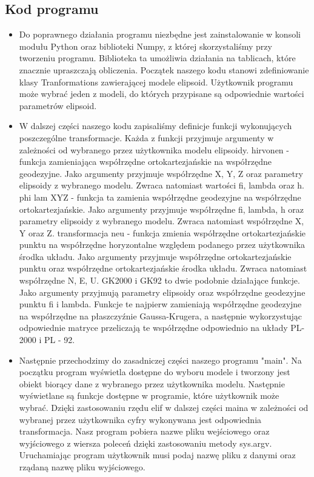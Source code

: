 \documentclass[10pt,a4paper]{article}
\begin{document}
\subsection{Kod programu}
\begin{itemize}
	\item Do poprawnego działania programu niezbędne jest zainstalowanie w konsoli modułu Python oraz biblioteki Numpy, z której skorzystaliśmy przy tworzeniu programu. Biblioteka ta umożliwia działania na tablicach, które znacznie upraszczają obliczenia. Początek naszego kodu stanowi zdefiniowanie klasy Tranformations zawierającej modele elipsoid. Użytkownik programu może wybrać jeden z modeli, do których przypisane są odpowiednie wartości parametrów elipsoid.
	\item W dalszej części naszego kodu zapisaliśmy definicje funkcji wykonujących poszczególne transformacje. Każda z funkcji przyjmuje argumenty w zależności od wybranego przez użytkownika modelu elipsoidy. \newline
	hirvonen - funkcja zamieniająca współrzędne ortokartezjańskie na współrzędne geodezyjne. Jako argumenty przyjmuje współrzędne X, Y, Z oraz parametry elipsoidy z wybranego modelu. Zwraca natomiast wartości fi, lambda oraz h.\newline
	phi lam XYZ - funkcja ta zamienia współrzędne geodezyjne na współrzędne ortokartezjańskie. Jako argumenty przyjmuje współrzędne fi, lambda, h oraz parametry elipsoidy z wybranego modelu. Zwraca natomiast współrzędne X, Y oraz Z.\newline
	transformacja neu - funkcja zmienia współrzędne ortokartezjańskie punktu na współrzędne horyzontalne względem podanego przez użytkownika środka układu. Jako argumenty przyjmuje współrzędne ortokartezjańskie punktu oraz współrzędne ortokartezjańskie środka układu. Zwraca natomiast współrzędne N, E, U.\newline
	GK2000 i GK92 to dwie podobnie działające funkcje. Jako argumenty przyjmują parametry elipsoidy oraz współrzędne geodezyjne punktu fi i lambda. Funkcje te najpierw zamieniają współrzędne geodezyjne na współrzędne na płaszczyźnie Gaussa-Krugera, a następnie wykorzystując odpowiednie matryce przeliczają te współrzędne odpowiednio na układy PL- 2000 i PL - 92.
	\item Następnie przechodzimy do zasadniczej części naszego programu "main". Na początku program wyświetla dostępne do wyboru modele i tworzony jest obiekt biorący dane z wybranego przez użytkownika modelu. Następnie wyświetlane są funkcje dostępne w programie, które użytkownik może wybrać. Dzięki zastosowaniu rzędu elif w dalszej części maina w zależności od wybranej przez użytkownika cyfry wykonywana jest odpowiednia transformacja. Nasz program pobiera nazwe pliku wejściowego oraz wyjściowego z wiersza poleceń dzięki zastosowaniu metody sys.argv. Uruchamiając program użytkownik musi podaj nazwę pliku z danymi oraz rządaną nazwę pliku wyjściowego.\newline

\end{itemize}
\end{document}
